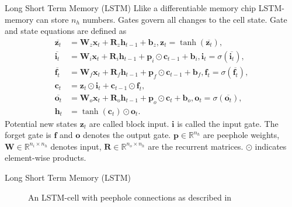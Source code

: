 \documentclass{beamer}
\begin{document}
    \begin{frame}{Long Short Term Memory (LSTM)}
      Llike a differentiable memory chip \cite{graves2012supervised} LSTM-memory can store $n_h$ numbers. Gates govern all changes to the cell state.
      Gate and state equations are defined as~\cite{hochreiter1997long,greff2016lstm}
      \begin{align}
          \overline{\mathbf{z}_t} &= \mathbf{W}_z \mathbf{x}_t + \mathbf{R}_z \mathbf{h}_{t-1}
                                + \mathbf{b}_z, \label{eq:state_candidate}
          \mathbf{z}_t = \tanh(\overline{\mathbf{z}_t}), \\
          \overline{\mathbf{i}_t} &= \mathbf{W}_i \mathbf{x}_t + \mathbf{R}_i \mathbf{h}_{t-1}
                               + \mathbf{p}_i \odot \mathbf{c}_{t-1}+ \mathbf{b}_i, \label{eq:input}
          \mathbf{i}_t = \sigma(\overline{\mathbf{i}_t}), \\
          \overline{\mathbf{f}_t} &= \mathbf{W}_f \mathbf{x}_t + \mathbf{R}_f \mathbf{h}_{t-1}
                                + \mathbf{p}_f \odot \mathbf{c}_{t-1}+ \mathbf{b}_f, \label{eq:forget} 
          \mathbf{f}_t = \sigma(\overline{\mathbf{f}_t}), \\
          \mathbf{c}_t &= \mathbf{z}_t \odot \mathbf{i}_t + \mathbf{c}_{t-1} \odot \mathbf{f}_t, \\
          \overline{\mathbf{o}_t} &= \mathbf{W}_o \mathbf{x}_t + \mathbf{R}_o \mathbf{h}_{t-1}
                                + \mathbf{p}_o \odot \mathbf{c}_t+ \mathbf{b}_o, \label{eq:output} 
          \mathbf{o}_t = \sigma(\overline{\mathbf{o}_t}), \\
          \mathbf{h}_t &= \tanh(\mathbf{c}_t) \odot \mathbf{o}_t.
      \end{align}
      Potential new states $\mathbf{z}_t$ are called block input. 
      $\mathbf{i}$ is called the input gate. The forget gate is $\mathbf{f}$ and
      $\mathbf{o}$ denotes the output gate.
      $\mathbf{p} \in \mathbb{R}^{n_h}$ are peephole weights,
      $\mathbf{W} \in \mathbb{R}^{n_i \times n_h}$ denotes input,
      $\mathbf{R} \in \mathbb{R}^{n_o \times n_h}$ are the recurrent matrices.
      $\odot$ indicates element-wise products. 
    \end{frame}


    \begin{frame}{Long Short Term Memory (LSTM)}
      \begin{figure}
        
        \caption{An LSTM-cell with peephole connections as described in \cite{hochreiter1997long,greff2016lstm}}
      \end{figure}
    \end{frame}
\end{document}
